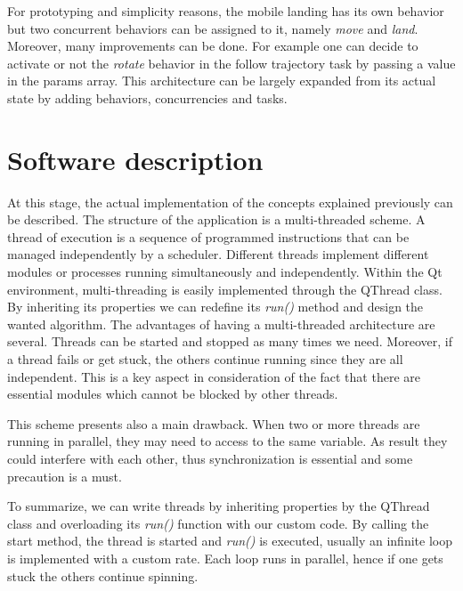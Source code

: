 For prototyping and simplicity reasons, the mobile landing has its own behavior but two concurrent behaviors can be assigned to it, namely \textit{move} and \textit{land}. Moreover, many improvements can be done. For example one can decide to activate or not the \textit{rotate} behavior in the follow trajectory task by passing a value in the params array. This architecture can be largely expanded from its actual state by adding behaviors, concurrencies and tasks.



\section{Software description}
\label{sec:sofdescrip}
At this stage, the actual implementation of the concepts explained previously can be described. The structure of the application is a multi-threaded scheme. A thread of execution is a sequence of programmed instructions that can be managed independently by a scheduler. Different threads implement different modules or processes running simultaneously and independently. Within the Qt environment, multi-threading is easily implemented through the QThread class. By inheriting its properties we can redefine its \textit{run()} method and design the wanted algorithm. The advantages of having a multi-threaded architecture are several. Threads can be started and stopped as many times we need. Moreover, if a thread fails or get stuck, the others continue running since they are all independent. This is a key aspect in consideration of the fact that there are essential modules which cannot be blocked by other threads. 

This scheme presents also a main drawback. When two or more threads are running in parallel, they may need to access to the same variable. As result they could interfere with each other, thus synchronization is essential and some precaution is a must. 

To summarize, we can write threads by inheriting properties by the QThread class and overloading its \textit{run()} function with our custom code. By calling the start method, the thread is started and \textit{run()} is executed, usually an infinite loop is implemented with a custom rate. Each loop runs in parallel, hence if one gets stuck the others continue spinning. 

